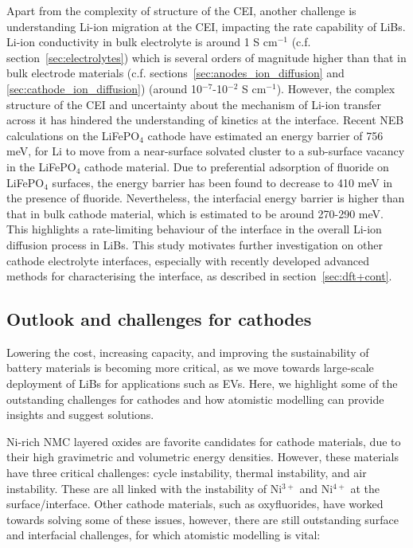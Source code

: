\documentclass[../main.tex]{subfiles}
\begin{document}
Apart from the complexity of structure of the CEI, another challenge is understanding Li-ion migration at the CEI, impacting the rate capability of LiBs. Li-ion conductivity in bulk electrolyte is around 1 S cm$^{-1}$ (c.f. section~\ref{sec:electrolytes}) which is several orders of magnitude higher than that in bulk electrode materials (c.f. sections~\ref{sec:anodes_ion_diffusion} and \ref{sec:cathode_ion_diffusion}) (around 10$^{-7}$-10$^{-2}$ S cm$^{-1}$).\cite{park2010review, VanDerVen2013} However, the complex structure of the CEI and uncertainty about the mechanism of Li-ion transfer across it has hindered the understanding of kinetics at the interface. Recent NEB calculations on the LiFePO$_4$ cathode have estimated an energy barrier of 756 meV, for Li to move from a near-surface solvated cluster to a sub-surface vacancy in the LiFePO$_4$ cathode material.\cite{Bhandari2019} Due to preferential adsorption of fluoride on LiFePO$_4$ surfaces,\cite{Edstrom2004, Bhandari2020} the energy barrier has been found to decrease to 410 meV in the presence of fluoride. Nevertheless, the interfacial energy barrier is higher than that in bulk cathode material, which is estimated to be around 270-290 meV.\cite{Morgan2004,Dathar2011} This highlights a rate-limiting behaviour of the interface in the overall Li-ion diffusion process in LiBs. This study motivates further investigation on other cathode electrolyte interfaces, especially with recently developed advanced methods for characterising the interface, as described in section~\ref{sec:dft+cont}.

\subsection{Outlook and challenges for cathodes}
\label{sec:cathodes_outlook}
Lowering the cost, increasing capacity, and improving the sustainability of battery materials is becoming more critical, as we move towards large-scale deployment of LiBs for applications such as EVs.\cite{dunn2011electrical} Here, we highlight some of the outstanding challenges for cathodes and how atomistic modelling can provide insights and suggest solutions.

Ni-rich NMC layered oxides are favorite candidates for cathode materials, due to their high gravimetric and volumetric energy densities.\cite{li2020high} However, these materials have three critical challenges: cycle instability, thermal instability, and air instability. These are all linked with the instability of Ni$^{3+}$ and Ni$^{4+}$ at the surface/interface. Other cathode materials, such as oxyfluorides, have worked towards solving some of these issues, however, there are still outstanding surface and interfacial challenges, for which atomistic modelling is vital:
\end{document}
